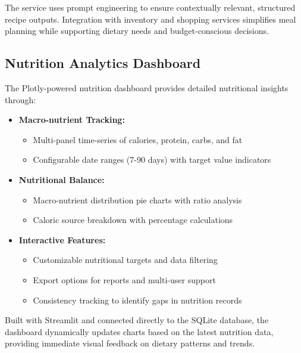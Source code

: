 \documentclass{ecai}
\begin{document}
The service uses prompt engineering to ensure contextually relevant, structured recipe outputs. Integration with inventory and shopping services simplifies meal planning while supporting dietary needs and budget-conscious decisions.


\subsection{Nutrition Analytics Dashboard}

The Plotly-powered nutrition dashboard provides detailed nutritional insights through:

\begin{itemize}[noitemsep,topsep=0pt]
    \item \textbf{Macro-nutrient Tracking:}
      \begin{itemize}[noitemsep,topsep=0pt]
        \item Multi-panel time-series of calories, protein, carbs, and fat
        \item Configurable date ranges (7-90 days) with target value indicators
      \end{itemize}

    \item \textbf{Nutritional Balance:}
      \begin{itemize}[noitemsep,topsep=0pt]
        \item Macro-nutrient distribution pie charts with ratio analysis
        \item Caloric source breakdown with percentage calculations
      \end{itemize}

    \item \textbf{Interactive Features:}
      \begin{itemize}[noitemsep,topsep=0pt]
        \item Customizable nutritional targets and data filtering
        \item Export options for reports and multi-user support
        \item Consistency tracking to identify gaps in nutrition records
      \end{itemize}
\end{itemize}

Built with Streamlit and connected directly to the SQLite database, the dashboard dynamically updates charts based on the latest nutrition data, providing immediate visual feedback on dietary patterns and trends.
\end{document}
